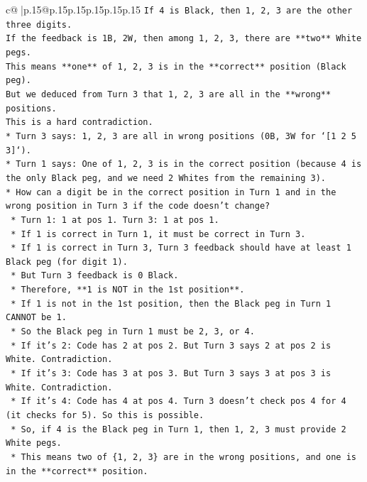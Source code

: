 \documentclass{article}
\begin{document}
{\begin{supertabular}{c@{$\;$}|p{.15\linewidth}@{}p{.15\linewidth}p{.15\linewidth}p{.15\linewidth}p{.15\linewidth}p{.15\linewidth}}
{{{\texttt{If 4 is Black, then 1, 2, 3 are the other three digits.} \\
\texttt{If the feedback is 1B, 2W, then among 1, 2, 3, there are **two** White pegs.} \\
\texttt{This means **one** of 1, 2, 3 is in the **correct** position (Black peg).} \\
\texttt{But we deduced from Turn 3 that 1, 2, 3 are all in the **wrong** positions.} \\
\texttt{This is a hard contradiction.} \\
\texttt{*   Turn 3 says: 1, 2, 3 are all in wrong positions (0B, 3W for `{[}1 2 5 3{]}`).} \\
\texttt{*   Turn 1 says: One of 1, 2, 3 is in the correct position (because 4 is the only Black peg, and we need 2 Whites from the remaining 3).} \\
\texttt{*   How can a digit be in the correct position in Turn 1 and in the wrong position in Turn 3 if the code doesn't change?} \\
\texttt{    *   Turn 1: 1 at pos 1. Turn 3: 1 at pos 1.} \\
\texttt{    *   If 1 is correct in Turn 1, it must be correct in Turn 3.} \\
\texttt{    *   If 1 is correct in Turn 3, Turn 3 feedback should have at least 1 Black peg (for digit 1).} \\
\texttt{    *   But Turn 3 feedback is 0 Black.} \\
\texttt{    *   Therefore, **1 is NOT in the 1st position**.} \\
\texttt{    *   If 1 is not in the 1st position, then the Black peg in Turn 1 CANNOT be 1.} \\
\texttt{    *   So the Black peg in Turn 1 must be 2, 3, or 4.} \\
\texttt{    *   If it's 2: Code has 2 at pos 2. But Turn 3 says 2 at pos 2 is White. Contradiction.} \\
\texttt{    *   If it's 3: Code has 3 at pos 3. But Turn 3 says 3 at pos 3 is White. Contradiction.} \\
\texttt{    *   If it's 4: Code has 4 at pos 4. Turn 3 doesn't check pos 4 for 4 (it checks for 5). So this is possible.} \\
\texttt{    *   So, if 4 is the Black peg in Turn 1, then 1, 2, 3 must provide 2 White pegs.} \\
\texttt{    *   This means two of \{1, 2, 3\} are in the wrong positions, and one is in the **correct** position.} \\
}}}
\end{supertabular}}
\end{document}
